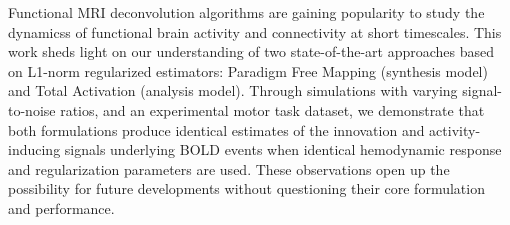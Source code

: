 Functional MRI deconvolution algorithms are gaining popularity to study the dynamicss of functional brain activity and connectivity at short timescales.
This work sheds light on our understanding of two state-of-the-art approaches based on L1-norm regularized estimators: Paradigm Free Mapping (synthesis model) and Total Activation (analysis model). Through simulations with varying signal-to-noise ratios, and an experimental motor task dataset, we demonstrate that both formulations produce identical estimates of the innovation and activity-inducing signals underlying BOLD events when identical hemodynamic response and regularization parameters are used. These observations open up the possibility for future developments without questioning their core formulation and performance.